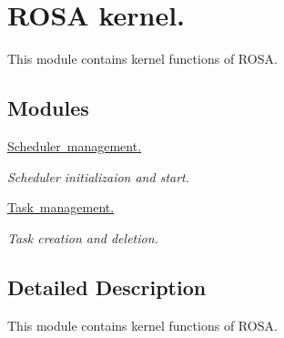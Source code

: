 \hypertarget{group__rosa__kernel}{}\section{R\+O\+SA kernel.}
\label{group__rosa__kernel}


This module contains kernel functions of R\+O\+SA.  


\subsection*{Modules}
\begin{DoxyCompactItemize}
\item 
\mbox{\hyperlink{group__rosa__kernel__sm}{Scheduler management.}}
\begin{DoxyCompactList}\small\item\em Scheduler initializaion and start. \end{DoxyCompactList}\item 
\mbox{\hyperlink{group__rosa__kernel__tm}{Task management.}}
\begin{DoxyCompactList}\small\item\em Task creation and deletion. \end{DoxyCompactList}\end{DoxyCompactItemize}


\subsection{Detailed Description}
This module contains kernel functions of R\+O\+SA. 

